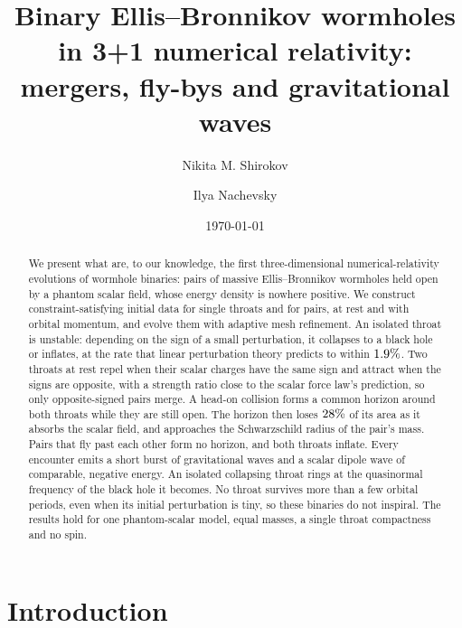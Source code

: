 \documentclass[twocolumn,floatfix,aps,prd,superscriptaddress,nofootinbib]{revtex4-2}
\begin{document}
\title{\texorpdfstring{Binary Ellis--Bronnikov wormholes in 3+1 numerical relativity: mergers, fly-bys and gravitational waves}{Binary Ellis-Bronnikov wormholes in 3+1 numerical relativity: mergers, fly-bys and gravitational waves}}

\author{Nikita M. Shirokov}
\author{Ilya Nachevsky}
\date{\today}


\begin{abstract}
We present what are, to our knowledge, the first three-dimensional numerical-relativity evolutions of wormhole binaries: pairs of massive Ellis--Bronnikov wormholes held open by a phantom scalar field, whose energy density is nowhere positive. We construct constraint-satisfying initial data for single throats and for pairs, at rest and with orbital momentum, and evolve them with adaptive mesh refinement. An isolated throat is unstable: depending on the sign of a small perturbation, it collapses to a black hole or inflates, at the rate that linear perturbation theory predicts to within $1.9\%$. Two throats at rest repel when their scalar charges have the same sign and attract when the signs are opposite, with a strength ratio close to the scalar force law's prediction, so only opposite-signed pairs merge. A head-on collision forms a common horizon around both throats while they are still open. The horizon then loses $28\%$ of its area as it absorbs the scalar field, and approaches the Schwarzschild radius of the pair's mass. Pairs that fly past each other form no horizon, and both throats inflate. Every encounter emits a short burst of gravitational waves and a scalar dipole wave of comparable, negative energy. An isolated collapsing throat rings at the quasinormal frequency of the black hole it becomes. No throat survives more than a few orbital periods, even when its initial perturbation is tiny, so these binaries do not inspiral. The results hold for one phantom-scalar model, equal masses, a single throat compactness and no spin.
\end{abstract}

\maketitle

\section{Introduction}
\label{sec:intro}
\end{document}
